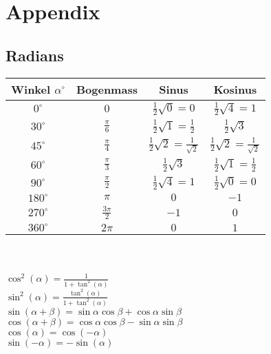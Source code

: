 \section{Appendix}

\subsection{Radians}

\begin{tabular}{cccc}
    Winkel $\alpha^\circ$ & Bogenmass & Sinus & Kosinus \\ [1.5ex] \hline
    $0^\circ$ & $0$ & $\frac{1}{2}\sqrt{0} = 0$ & $\frac{1}{2}\sqrt{4} = 1$ \\ [1.5ex] \hline
    $30^\circ$ & $\frac{\pi}{6}$ & $\frac{1}{2} \sqrt{1} = \frac{1}{2}$ & $\frac{1}{2} \sqrt{3}$ \\ [1.5ex] \hline
    $45^\circ$ & $\frac{\pi}{4}$ & $\frac{1}{2}\sqrt{2} = \frac{1}{\sqrt{2}}$ & $\frac{1}{2}\sqrt{2} = \frac{1}{\sqrt{2}}$ \\ [1.5ex] \hline
    $60^\circ$ & $\frac{\pi}{3}$ & $\frac{1}{2}\sqrt{3}$ & $\frac{1}{2}\sqrt{1} = \frac{1}{2}$ \\ [1.5ex] \hline
    $90^\circ$ & $\frac{\pi}{2}$ & $\frac{1}{2}\sqrt{4} = 1$ & $\frac{1}{2} \sqrt{0} = 0$ \\ [1.5ex] \hline
    $180^\circ$ & $\pi$ & $0$ & $-1$ \\ [1.5ex] \hline
    $270^\circ$ & $\frac{3\pi}{2}$ & $-1$ & $0$ \\ [1.5ex] \hline
    $360^\circ$ & $2\pi$ & $0$ & $1$ \\ [1.5ex] \hline
\end{tabular} \\
\\
$\cos^2(\alpha) = \frac{1}{1 + \tan^2(\alpha)}$ \\
$\sin^2(\alpha) = \frac{\tan^2(\alpha)}{1 + \tan^2(\alpha)}$ \\
$\sin(\alpha + \beta) = \sin \alpha \cos \beta + \cos \alpha \sin \beta$ \\
$\cos(\alpha + \beta) = \cos \alpha \cos \beta - \sin \alpha \sin \beta$ \\
$\cos(\alpha) = \cos(-\alpha)$ \\
$\sin(-\alpha) = -\sin(\alpha)$ \\
